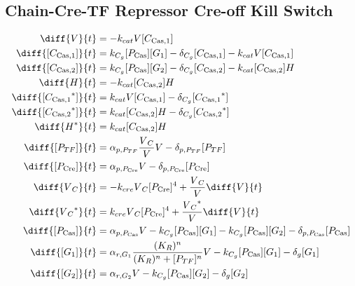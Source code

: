 \subsection{Chain-Cre-TF Repressor Cre-off Kill Switch}
\label{s:Chain_Cre_TF_Repressor_Cre_off_Kill_Switch}

\begin{align}
\diff{\vectorGen{}}{t} & = - \casCutRate{{}}\vectorGen{}\conc{\cplx{\cas}{1}}\\
\diff{\conc{\cplx{\cas}{1}}}{t} & =  \gRnaBind{}\conc{\proSp{\cas{}}}\conc{\gRna{1}} - \casCompDegradeRate{}\conc{\cplx{\cas}{1}} - \casCutRate{{}}\vectorGen{}\conc{\cplx{\cas}{1}}\\
\diff{\conc{\cplx{\cas}{2}}}{t} & =  \gRnaBind{}\conc{\proSp{\cas{}}}\conc{\gRna{2}} - \casCompDegradeRate{}\conc{\cplx{\cas}{2}} - \casCutRate{{}}\conc{\cplx{\cas}{2}}\hostGen{}\\
\diff{\hostGen{}}{t} & = - \casCutRate{{}}\conc{\cplx{\cas}{2}}\hostGen{}\\
\diff{\conc{\bound{\cplx{\cas}{1}}}}{t} & =  \casCutRate{{}}\vectorGen{}\conc{\cplx{\cas}{1}} - \casCompDegradeRate{}\conc{\bound{\cplx{\cas}{1}}}\\
\diff{\conc{\bound{\cplx{\cas}{2}}}}{t} & =  \casCutRate{{}}\conc{\cplx{\cas}{2}}\hostGen{} - \casCompDegradeRate{}\conc{\bound{\cplx{\cas}{2}}}\\
\diff{\edited{\hostGen{}}}{t} & =  \casCutRate{{}}\conc{\cplx{\cas}{2}}\hostGen{}\\
\diff{\conc{\proSp{TF}}}{t} & =  \txtlRate{\proSp{TF}}\frac{\vectorGen{}_C}{\vectorGen{}}\vectorGen{} - \proDegradeRate{\proSp{TF}}\conc{\proSp{TF}}\\
\diff{\conc{\proSp{\cre{}}}}{t} & =  \txtlRate{\proSp{\cre{}}}\vectorGen{} - \proDegradeRate{\proSp{\cre{}}}\conc{\proSp{\cre{}}}\\
\diff{\vectorGen{}_C}{t} & = - \creCutRate{} \vectorGen{}_C \conc{\proSp{\cre{}}}^4 + \frac{\vectorGen{}_C}{\vectorGen{}} \diff{\vectorGen{}}{t}\\
\diff{\edited{\vectorGen{}_C}}{t} & =  \creCutRate{} \vectorGen{}_C \conc{\proSp{\cre{}}}^4 + \frac{\edited{\vectorGen{}_C}}{\vectorGen{}} \diff{\vectorGen{}}{t}\\
\diff{\conc{\proSp{\cas{}}}}{t} & =  \txtlRate{\proSp{\cas{}}}\vectorGen{} - \gRnaBind{}\conc{\proSp{\cas{}}}\conc{\gRna{1}} - \gRnaBind{}\conc{\proSp{\cas{}}}\conc{\gRna{2}} - \proDegradeRate{\proSp{\cas{}}}\conc{\proSp{\cas{}}}\\
\diff{\conc{\gRna{1}}}{t} & =  \txRate{\gRna{1}}\frac{(K_R)^n}{(K_R)^n + \conc{\proSp{TF}}^n}\vectorGen{} - \gRnaBind{}\conc{\proSp{\cas{}}}\conc{\gRna{1}} - \rnaDegradeRate{}\conc{\gRna{1}}\\
\diff{\conc{\gRna{2}}}{t} & =  \txRate{\gRna{2}}\vectorGen{} - \gRnaBind{}\conc{\proSp{\cas{}}}\conc{\gRna{2}} - \rnaDegradeRate{}\conc{\gRna{2}}
\end{align}

